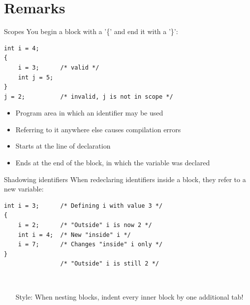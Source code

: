 \section{Remarks}

\begin{frame}[fragile]{Scopes}
	You begin a block with a '\{' and end it with a '\}':
	\begin{lstlisting}
int i = 4;
{
    i = 3;      /* valid */
    int j = 5;
}
j = 2;          /* invalid, j is not in scope */
\end{lstlisting}
	\begin{itemize}
		\item Program area in which an identifier may be used
		\item Referring to it anywhere else causes compilation errors
		\item Starts at the line of declaration
		\item Ends at the end of the block, in which the variable was declared
	\end{itemize}
\end{frame}

\begin{frame}[fragile]{Shadowing identifiers}
	When redeclaring identifiers inside a block, they refer to a new variable:
	\begin{lstlisting}
int i = 3;      /* Defining i with value 3 */
{
    i = 2;      /* "Outside" i is now 2 */
    int i = 4;  /* New "inside" i */
    i = 7;      /* Changes "inside" i only */
}
                /* "Outside" i is still 2 */
\end{lstlisting}\ \\
    \medskip
    \begin{itemize}
        \item[Style:] When nesting blocks, indent every inner block by
            one additional tab!
    \end{itemize}
\end{frame}

